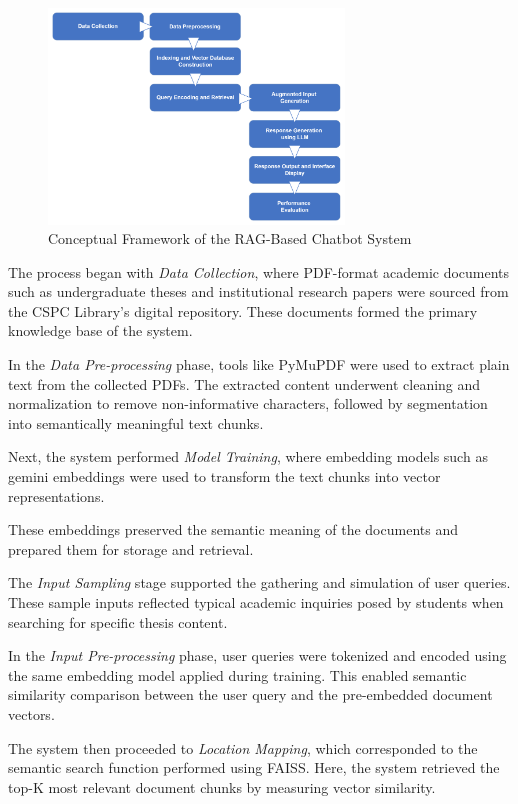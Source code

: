 \begin{refsection}
\begin{figure}[H]
    \centering
    \includegraphics[width=0.7\textwidth]{figures/framework.png}
    \caption{Conceptual Framework of the RAG-Based Chatbot System}
    \label{fig:conceptual_framework}
\end{figure}

The process began with \textit{Data Collection}, where PDF-format academic documents such as undergraduate theses and institutional research papers were sourced from the CSPC Library’s digital repository. These documents formed the primary knowledge base of the system.

In the \textit{Data Pre-processing} phase, tools like PyMuPDF were used to extract plain text from the collected PDFs. The extracted content underwent cleaning and normalization to remove non-informative characters, followed by segmentation into semantically meaningful text chunks.

Next, the system performed \textit{Model Training}, where embedding models such as gemini embeddings were used to transform the text chunks into vector representations.


These embeddings preserved the semantic meaning of the documents and prepared them for storage and retrieval.

The \textit{Input Sampling} stage supported the gathering and simulation of user queries. These sample inputs reflected typical academic inquiries posed by students when searching for specific thesis content.

In the \textit{Input Pre-processing} phase, user queries were tokenized and encoded using the same embedding model applied during training. This enabled semantic similarity comparison between the user query and the pre-embedded document vectors.

The system then proceeded to \textit{Location Mapping}, which corresponded to the semantic search function performed using FAISS. Here, the system retrieved the top-K most relevant document chunks by measuring vector similarity.


\end{refsection}
